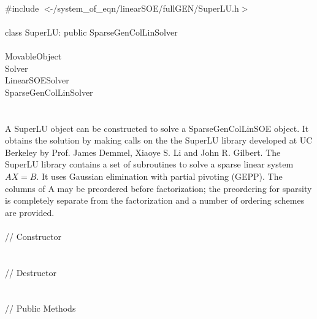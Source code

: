 
   \\
\indent \#include $<\tilde{
}$/system\_of\_eqn/linearSOE/fullGEN/SuperLU.h$>$  \\ 

  \\
\indent class SuperLU: public SparseGenColLinSolver  \\

 \\
\indent  MovableObject \\
\indent\indent  Solver \\
\indent\indent\indent LinearSOESolver \\
\indent\indent\indent\indent  SparseGenColLinSolver \\
\indent\indent\indent\indent{} \\

  \\
\indent A SuperLU object can be constructed to solve
a SparseGenColLinSOE object. It obtains the solution by making calls on the
the SuperLU library developed at UC Berkeley by Prof. James Demmel, 
Xiaoye S. Li and John R. Gilbert.
The SuperLU library contains a set of subroutines to solve a sparse
linear system  $AX=B$. It uses Gaussian elimination with partial
pivoting (GEPP). The columns of A may be preordered before
factorization; the preordering for sparsity is completely separate
from the factorization and a number of ordering schemes are provided. \\

  \\
\indent // Constructor \\
  \\ \\
\indent // Destructor \\
\\  \\
\indent // Public Methods \\
 \\
 \\
\\ 
\\ 

